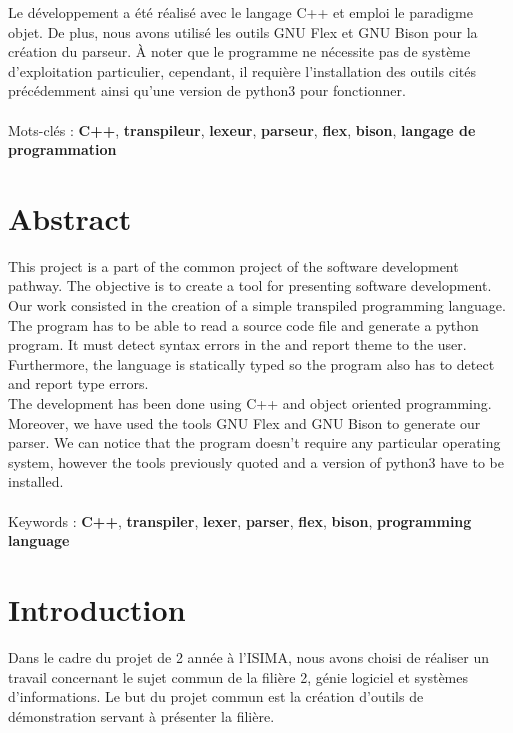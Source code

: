 \documentclass[a4paper]{article}%
\begin{document}
Le développement a été réalisé avec le langage C++ et emploi le paradigme objet.
De plus, nous avons utilisé les outils GNU Flex et GNU Bison pour la création du
parseur. À noter que le programme ne nécessite pas de système d'exploitation
particulier, cependant, il requière l'installation des outils cités précédemment
ainsi qu'une version de python3 pour fonctionner. %
\\~\\

\noindent
Mots-clés : \textbf{C++}, \textbf{transpileur}, \textbf{lexeur}, \textbf{parseur},
\textbf{flex}, \textbf{bison},  \textbf{langage de programmation}
\\[2\baselineskip]

\section*{Abstract}

This project is a part of the common project of the software development
pathway. The objective is to create a tool for presenting software development.
Our work consisted in the creation of a simple transpiled programming language.
The program has to be able to read a source code file and generate a python
program. It must detect syntax errors in the and report theme to the user.
Furthermore, the language is statically typed so the program also has to detect
and report type errors.\\

The development has been done using C++ and object oriented programming.
Moreover, we have used the tools GNU Flex and GNU Bison to generate our parser.
We can notice that the program doesn't require any particular operating system,
however the tools previously quoted and a version of python3 have to be
installed.
\\~\\

\noindent
Keywords : \textbf{C++}, \textbf{transpiler}, \textbf{lexer}, \textbf{parser},
\textbf{flex}, \textbf{bison}, \textbf{programming language}

\clearpage{}

\clearpage
\section*{Introduction}
\large
Dans le cadre du projet de 2 année à l'ISIMA, nous avons choisi de
réaliser un travail concernant le sujet commun de la filière 2, génie logiciel
et systèmes d'informations. Le but du projet commun est la création d'outils de
démonstration servant à présenter la filière.\\
\end{document}
